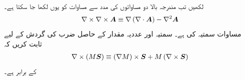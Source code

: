 لکھیں تب مندرجہ بالا دو مساواتوں کی مدد سے مساوات  کو یوں لکھا جا سکتا ہے۔
\begin{align}\label{مساوات_مقناطیسی_گردش_کی_گردش_ب}
\nabla \times \nabla \times {\ensuremath{{\boldsymbol{A}}}} \equiv \nabla \left(\nabla \cdot {\ensuremath{{\boldsymbol{A}}}} \right)-\nabla^2 {{\boldsymbol{A}}}
\end{align}
مساوات  سمتیہ کی  ہے۔
سمتیہ  اور عددیہ مقدار  کے حاصل ضرب کی گردش کے لیے ثابت کریں کہ
\begin{align}
\nabla \times \left(M{{\boldsymbol{S}}}\right) \equiv \left(\nabla M\right) \times {\ensuremath{{\boldsymbol{S}}}}+M \left(\nabla \times {\ensuremath{{\boldsymbol{S}}}}\right)
\end{align}
کے برابر ہے۔

